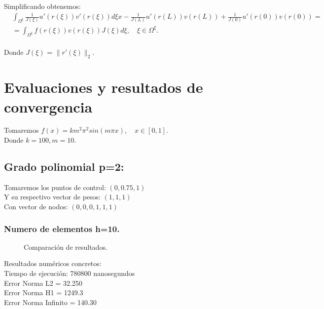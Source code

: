 \documentclass[12pt]{article}
\begin{document}
Simplificando obtenemos:
\begin{align*}
&\int_{\Omega^{\xi}} \frac{1}{J(\xi)} u'(r(\xi))  v'(r(\xi)) d\xi x-\frac{1}{J(L)}u'(r(L))v(r(L))+\frac{1}{J(0)}u'(r(0))v(r(0)) =\\
&=\int_{\Omega^{\xi}} f(r(\xi))v(r(\xi)) J(\xi) d\xi, \quad \xi \in \Omega^{\xi} .
\end{align*}\\

Donde $J(\xi)$ = $\|r'(\xi)\|_{2}$.

\section{Evaluaciones y resultados de convergencia}

Tomaremos $f(x)=k m^2\pi^2sin(m \pi x), \quad x \in [0,1].$\\
Donde $k=100, m=10$.\\

\subsection{Grado polinomial p=2:}
Tomaremos los puntos de control: ${(0, 0.75, 1)}$\\
Y su respectivo vector de pesos: $ (1,1,1)$\\
Con vector de nodos: ${(0,0,0,1,1,1)}$\\
\subsubsection{Numero de elementos h=10.}
\begin{figure}[H]
    \centering
    \begin{subfigure}{0.32\textwidth}
        
    \end{subfigure}
    \hfill
    \begin{subfigure}{0.32\textwidth}
        
    \end{subfigure}
    \hfill
    \begin{subfigure}{0.32\textwidth}
        
    \end{subfigure}
    \caption{Comparación de resultados.}
    \label{fig:tresgraficas}
\end{figure}
Resultados numéricos concretos:\\
Tiempo de ejecución: 780800 nanosegundos\\
Error Norma L2 = 32.250\\
Error Norma H1 = 1249.3\\
Error Norma Infinito = 140.30\\
\end{document}

